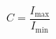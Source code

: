 \documentclass[../main.tex]{subfiles}%
\begin{document}
%
    \Xequation%
    \begin{equation}%
        C = \dfrac{I_\textrm{max}}{I_\textrm{min}}%
        \label{eq:contrast-basic}%
    \end{equation}%
\end{document}
